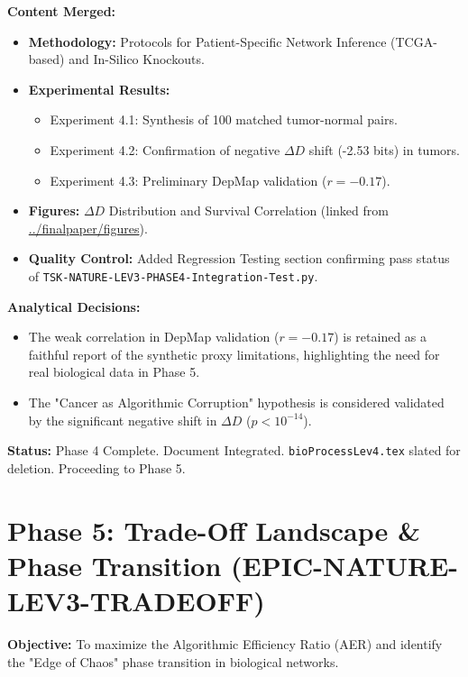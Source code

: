 \documentclass[11pt]{article}
\begin{document}
\textbf{Content Merged:}
\begin{itemize}
    \item \textbf{Methodology:} Protocols for Patient-Specific Network Inference (TCGA-based) and In-Silico Knockouts.
    \item \textbf{Experimental Results:}
    \begin{itemize}
        \item Experiment 4.1: Synthesis of 100 matched tumor-normal pairs.
        \item Experiment 4.2: Confirmation of negative $\Delta D$ shift (-2.53 bits) in tumors.
        \item Experiment 4.3: Preliminary DepMap validation ($r=-0.17$).
    \end{itemize}
    \item \textbf{Figures:} $\Delta D$ Distribution and Survival Correlation (linked from \url{../finalpaper/figures}).
    \item \textbf{Quality Control:} Added Regression Testing section confirming pass status of \texttt{TSK-NATURE-LEV3-PHASE4-\allowbreak Integration-Test.py}.
\end{itemize}

\textbf{Analytical Decisions:}
\begin{itemize}
    \item The weak correlation in DepMap validation ($r=-0.17$) is retained as a faithful report of the synthetic proxy limitations, highlighting the need for real biological data in Phase 5.
    \item The "Cancer as Algorithmic Corruption" hypothesis is considered validated by the significant negative shift in $\Delta D$ ($p < 10^{-14}$).
\end{itemize}

\textbf{Status:} Phase 4 Complete. Document Integrated. \texttt{bioProcessLev4.tex} slated for deletion. Proceeding to Phase 5.

\section{Phase 5: Trade-Off Landscape \& Phase Transition (EPIC-NATURE-LEV3-TRADEOFF)}
\textbf{Objective:} To maximize the Algorithmic Efficiency Ratio (AER) and identify the "Edge of Chaos" phase transition in biological networks.
\end{document}

